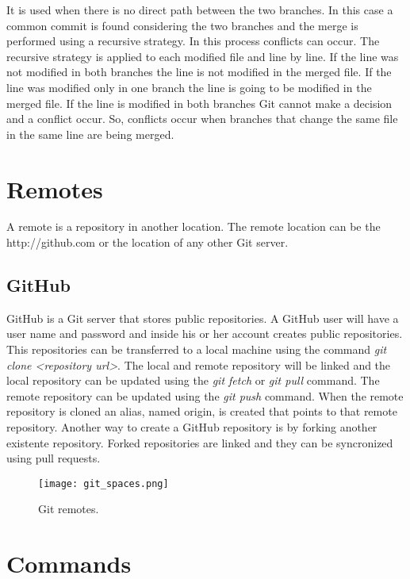 \begin{refsection}
It is used when there is no direct path between the two branches. In this case a common commit is found considering the two branches and the merge is performed using a recursive strategy.
In this process conflicts can occur.
The recursive strategy is applied to each modified file and line by line.
If the line was not modified in both branches the line is not modified in the merged file.
If the line was modified only in one branch the line is going to be modified in the merged file.
If the line is modified in both branches Git cannot make a decision and a conflict occur.
So, conflicts occur when branches that change the same file in the same line are being merged.

\section{Remotes}

A remote is a repository in another location. The remote location can be the http://github.com or the location of any other Git server.

\subsection{GitHub}

GitHub is a Git server that stores public repositories.
A GitHub user will have a user name and password and inside his or her account creates public repositories.
This repositories can be transferred to a local machine using the command \emph{git clone <repository url>}.
The local and remote repository will be linked and the local repository can be updated using the \emph{git fetch} or \emph{git pull} command.
The remote repository can be updated using the \emph{git push} command.
When the remote repository is cloned an alias, named origin, is created that points to that remote repository.
Another way to create a GitHub repository is by forking another existente repository.
Forked repositories are linked and they can be syncronized using pull requests.

\begin{figure}[h!]
  \centering
  \texttt{[image: git\_spaces.png]}
  \caption{Git remotes.}\label{git_remotes}
\end{figure}

\section{Commands}



\end{refsection}
